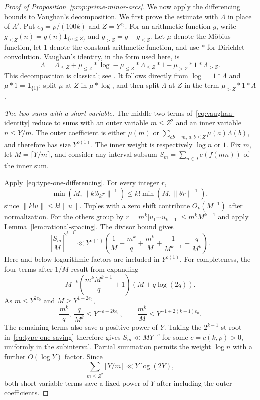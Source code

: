 \begin{proof}[Proof of Proposition~\ref{prop:prime-minor-arcs}]
We now apply the differencing bounds to Vaughan's decomposition.
We first prove the estimate with $\Lambda$ in place of $\Lambda'$.
Put $e_0=\rho/(100k)$ and $Z=Y^{e_0}$.  For an arithmetic function
$g$, write $g_{\le Z}(n)=g(n)\mathbf 1_{\{n\le Z\}}$ and
$g_{>Z}=g-g_{\le Z}$.  Let $\mu$ denote the M\"obius function, let
$1$ denote the constant arithmetic function, and use $*$ for Dirichlet
convolution.  Vaughan's identity, in the form used here, is
\begin{equation}\label{eq:vaughan-identity}
 \Lambda=\Lambda_{\le Z}+\mu_{\le Z}*\log
       -\mu_{\le Z}*\Lambda_{\le Z}*1
       +\mu_{>Z}*1*\Lambda_{>Z}.
\end{equation}
This decomposition is classical; see \cite[Chapter~3]{Vaughan1997}.
It follows directly from $\log=1*\Lambda$ and
$\mu*1=\mathbf 1_{\{1\}}$: split $\mu$ at $Z$ in $\mu*\log$, and then
split $\Lambda$ at $Z$ in the term $\mu_{>Z}*1*\Lambda$.

\emph{The two sums with a short variable.}
The middle two terms of~\eqref{eq:vaughan-identity} reduce to sums
with an outer variable $m\le Z^2$ and an inner variable $n\le Y/m$.
The outer coefficient is either $\mu(m)$ or
$\sum_{ab=m,\,a,b\le Z}\mu(a)\Lambda(b)$, and therefore has size
$Y^{o(1)}$.  The inner weight is respectively $\log n$ or $1$.
Fix $m$, let $M=\lceil Y/m\rceil$, and consider any interval subsum
$S_m=\sum_{n\in J}e(f(mn))$ of the inner sum.

Apply~\eqref{eq:type-one-differencing}.  For every integer $r$,
\[
 \min(M,\|k!b_kr\|^{-1})
 \le k!\min(M,\|\theta r\|^{-1}),
\]
since $\|k!u\|\le k!\|u\|$.  Tuples with a zero shift contribute
$O_k(M^{-1})$ after normalization.  For the others group by
$r=m^k|u_1\cdots u_{k-1}|\le m^kM^{k-1}$ and apply
Lemma~\ref{lem:rational-spacing}.  The divisor bound gives
\begin{equation}\label{eq:type-one-saving}
 \left|\frac{S_m}{M}\right|^{2^{k-1}}
 \ll Y^{o(1)}\left(
 \frac1M+\frac{m^k}{q}+\frac{m^k}{M}
       +\frac1{M^{k-1}}+\frac q{M^k}\right).
\end{equation}
Here and below logarithmic factors are included in $Y^{o(1)}$.
For completeness, the four terms after $1/M$ result from expanding
\[
 M^{-k}\left(\frac{m^kM^{k-1}}q+1\right)(M+q\log(2q)).
\]
As $m\le Y^{2e_0}$ and $M\ge Y^{1-2e_0}$,
\[
 \frac{m^k}{q},\ \frac q{M^k}\le Y^{-\rho+2ke_0},\qquad
 \frac{m^k}{M}\le Y^{-1+2(k+1)e_0}.
\]
The remaining terms also save a positive power of $Y$.  Taking the
$2^{k-1}$-st root in~\eqref{eq:type-one-saving} therefore gives
$S_m\ll M Y^{-c}$ for some $c=c(k,\rho)>0$, uniformly in the subinterval.
Partial summation permits the weight $\log n$ with a further
$O(\log Y)$ factor.  Since
\[
 \sum_{m\le Z^2}\lceil Y/m\rceil\ll Y\log(2Y),
\]
both short-variable terms save a fixed power of $Y$ after including
the outer coefficients.


\end{proof}
